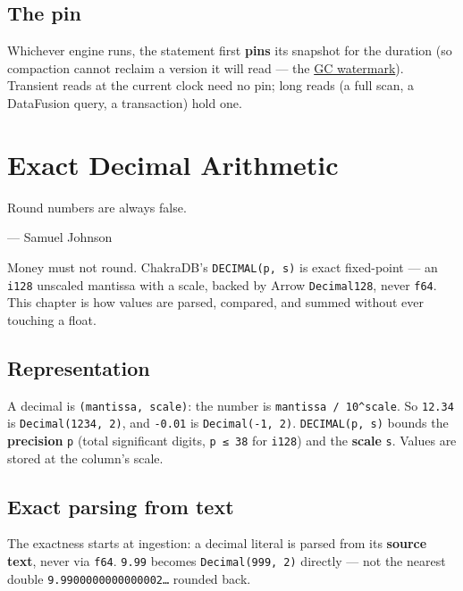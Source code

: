 \documentclass[
  11pt,
  openany]{book}
\begin{document}
\section{The pin}\label{the-pin}

Whichever engine runs, the statement first \textbf{pins} its snapshot
for the duration (so compaction cannot reclaim a version it will read
--- the \href{mvcc.md}{GC watermark}). Transient reads at the current
clock need no pin; long reads (a full scan, a DataFusion query, a
transaction) hold one.

\chapter{Exact Decimal Arithmetic}\label{exact-decimal-arithmetic}

\epigraph{Round numbers are always false.}{--- Samuel Johnson}

Money must not round. ChakraDB's \texttt{DECIMAL(p,\ s)} is exact
fixed-point --- an \texttt{i128} unscaled mantissa with a scale, backed
by Arrow \texttt{Decimal128}, never \texttt{f64}. This chapter is how
values are parsed, compared, and summed without ever touching a float.

\section{Representation}\label{representation}

A decimal is \texttt{(mantissa,\ scale)}: the number is
\texttt{mantissa\ /\ 10\^{}scale}. So \texttt{12.34} is
\texttt{Decimal(1234,\ 2)}, and \texttt{-0.01} is
\texttt{Decimal(-1,\ 2)}. \texttt{DECIMAL(p,\ s)} bounds the
\textbf{precision} \texttt{p} (total significant digits,
\texttt{p\ ≤\ 38} for \texttt{i128}) and the \textbf{scale} \texttt{s}.
Values are stored at the column's scale.

\section{Exact parsing from text}\label{exact-parsing-from-text}

The exactness starts at ingestion: a decimal literal is parsed from its
\textbf{source text}, never via \texttt{f64}. \texttt{9.99} becomes
\texttt{Decimal(999,\ 2)} directly --- not the nearest double
\texttt{9.9900000000000002…} rounded back.
\end{document}
